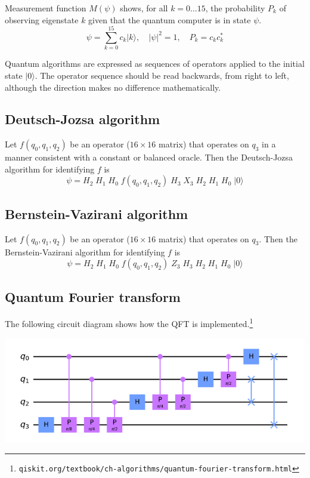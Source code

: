\documentclass[12pt]{article}
\begin{document}
\bigskip
\noindent
Measurement function $M(\psi)$ shows, for all $k=0\ldots15$, the probability $P_k$ of observing eigenstate $k$
given that the quantum computer is in state $\psi$.
\begin{equation*}
\psi=\sum_{k=0}^{15}c_k|k\rangle,\quad|\psi|^2=1,\quad P_k=c_kc_k^*
\end{equation*}

\noindent
Quantum algorithms are expressed as sequences of operators applied
to the initial state $|0\rangle$.
The operator sequence should be read backwards, from right to left,
although the direction makes no difference mathematically.

\subsection*{Deutsch-Jozsa algorithm}
Let $f(q_0,q_1,q_2)$ be an operator ($16\times16$ matrix) that operates on $q_3$
in a manner consistent with a constant or balanced oracle.
Then the Deutsch-Jozsa algorithm for identifying $f$ is
\begin{equation*}
\psi = H_2 \; H_1 \; H_0 \; f(q_0,q_1,q_2) \; H_3 \; X_3 \; H_2 \; H_1 \; H_0 \; |0\rangle
\end{equation*}

\subsection*{Bernstein-Vazirani algorithm}
Let $f(q_0,q_1,q_2)$ be an operator ($16\times16$ matrix) that operates on $q_3$.
Then the Bernstein-Vazirani algorithm for identifying $f$ is
\begin{equation*}
\psi = H_2 \; H_1 \; H_0 \; f(q_0,q_1,q_2) \; Z_3 \; H_3 \; H_2 \; H_1 \; H_0 \; |0\rangle
\end{equation*}

\subsection*{Quantum Fourier transform}
The following circuit diagram shows how the QFT is implemented.\footnote
{\tt qiskit.org/textbook/ch-algorithms/quantum-fourier-transform.html}

\begin{center}
\includegraphics[scale=0.5]{qft.png}
\end{center}
\end{document}
